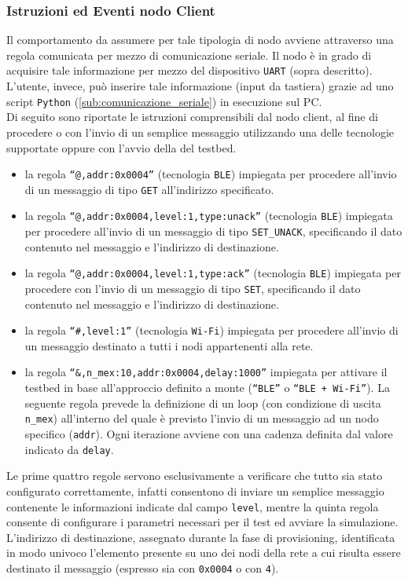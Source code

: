 \subsubsection{Istruzioni ed Eventi nodo Client}
\label{subsub:parametri_testbed}
Il comportamento da assumere per tale tipologia di nodo avviene attraverso una regola comunicata per mezzo di comunicazione seriale. Il nodo è in grado di acquisire tale informazione per mezzo del dispositivo \texttt{UART} (sopra descritto). L'utente, invece, può inserire tale informazione (input da tastiera) grazie ad uno script \texttt{Python} (\ref{sub:comunicazione_seriale}) in esecuzione sul PC. \\

\noindent Di seguito sono riportate le istruzioni comprensibili dal nodo client, al fine di procedere o con l'invio di un semplice messaggio utilizzando una delle tecnologie supportate oppure con l'avvio della del testbed.

\begin{itemize}
    \item la regola \texttt{``@,addr:0x0004''} (tecnologia \texttt{BLE}) impiegata per procedere all'invio di un messaggio di tipo \texttt{GET} all'indirizzo specificato.
    \item la regola \texttt{``@,addr:0x0004,level:1,type:unack''} (tecnologia \texttt{BLE}) impiegata per procedere all'invio di un messaggio di tipo \texttt{SET\_UNACK}, specificando il dato contenuto nel messaggio e l'indirizzo di destinazione.
    \item la regola \texttt{``@,addr:0x0004,level:1,type:ack''} (tecnologia \texttt{BLE}) impiegata per procedere con l'invio di un messaggio di tipo \texttt{SET}, specificando il dato contenuto nel messaggio e l'indirizzo di destinazione.
    
    \item la regola \texttt{``\#,level:1''} (tecnologia \texttt{Wi-Fi}) impiegata per procedere all'invio di un messaggio destinato a tutti i nodi appartenenti alla rete.
    
    \item la regola \texttt{``\&,n\_mex:10,addr:0x0004,delay:1000''} impiegata per attivare il testbed in base all'approccio definito a monte (\texttt{``BLE''} o \texttt{``BLE + Wi-Fi''}). La seguente regola prevede la definizione di un loop (con condizione di uscita \texttt{n\_mex}) all'interno del quale è previsto l'invio di un messaggio ad un nodo specifico (\texttt{addr}). Ogni iterazione avviene con una cadenza definita dal valore indicato da \texttt{delay}.

\end{itemize}
\noindent Le prime quattro regole servono esclusivamente a verificare che tutto sia stato configurato correttamente, infatti consentono di inviare un semplice messaggio contenente le informazioni indicate dal campo \texttt{level}, mentre la quinta regola consente di configurare i parametri necessari per il test ed avviare la simulazione. L'indirizzo di destinazione, assegnato durante la fase di provisioning, identificata in modo univoco l'elemento presente su uno dei nodi della rete a cui risulta essere destinato il messaggio (espresso sia con \texttt{0x0004} o con \texttt{4}).\\

